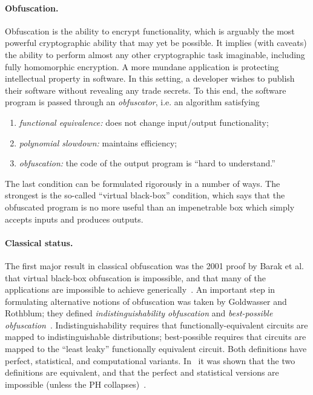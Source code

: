 \documentclass[11pt]{article}
\numberwithin{equation}{section}
\begin{document}
{\paragraph{Obfuscation.} Obfuscation is the ability to encrypt functionality, which is arguably the most powerful cryptographic ability that may yet be possible. It implies (with caveats) the ability to perform almost any other cryptographic task imaginable, including fully homomorphic encryption. A more mundane application is protecting intellectual property in software. In this setting, a developer wishes to publish their software without revealing any trade secrets. To this end, the software program is passed through an \emph{obfuscator}, i.e. an algorithm satisfying
\begin{enumerate}\label{def:obf-informal}
\item \emph{functional equivalence:} does not change input/output functionality;
\item \emph{polynomial slowdown:} maintains efficiency;
\item \emph{obfuscation:} the code of the output program is ``hard to understand.''
\end{enumerate}
The last condition can be formulated rigorously in a number of ways. The strongest is the so-called ``virtual black-box'' condition, which says that the obfuscated program is no more useful than an impenetrable box which simply accepts inputs and produces outputs. 

\paragraph{Classical status.} The first major result in classical obfuscation was the 2001 proof by Barak et al. that virtual black-box obfuscation is impossible, and that many of the applications are impossible to achieve generically~\cite{BGIRSVY01, BGIRSVY12}. An important step in formulating alternative notions of obfuscation was taken by Goldwasser and Rothblum; they defined \emph{indistinguishability obfuscation} and \emph{best-possible obfuscation}~\cite{GR07}. Indistinguishability requires that functionally-equivalent circuits are mapped to indistinguishable distributions; best-possible requires that circuits are mapped to the ``least leaky'' functionally equivalent circuit. Both definitions have perfect, statistical, and computational variants. In~\cite{GR07} it was shown that the two definitions are equivalent, and that the perfect and statistical versions are impossible (unless the PH collapses)~\cite{GR07}. 

}
\end{document}

